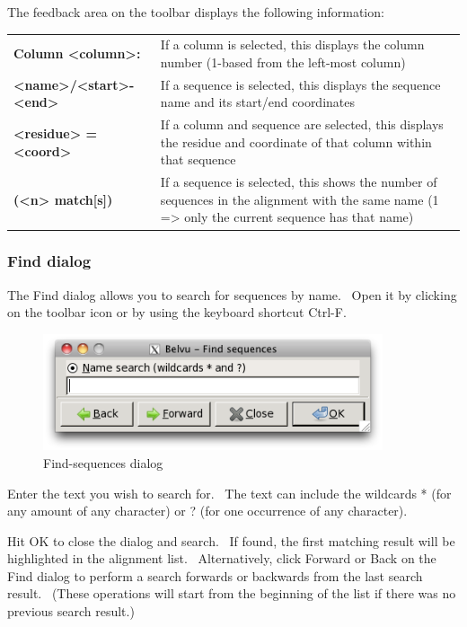 \documentclass[letterpaper]{article}
\begin{document}
\bigskip

The feedback area on the toolbar displays the following information:

\begin{supertabular}{>{\bfseries}p{0.4\textwidth} p{0.6\textwidth}}
Column {\textless}column{\textgreater}: &
If a column is selected, this displays the column number (1-based from the left-most column)\\
{\textless}name{\textgreater}/{\textless}start{\textgreater}-{\textless}end{\textgreater} &
If a sequence is selected, this displays the sequence name and its start/end coordinates\\
{\textless}residue{\textgreater} = {\textless}coord{\textgreater} &
If a column and sequence are selected, this displays the residue and coordinate of that column within that sequence\\
({\textless}n{\textgreater} match[s]) &
If a sequence is selected, this shows the number of sequences in the alignment with the same name (1 ={\textgreater} only the current sequence has that name)\\
\end{supertabular}


\subsubsection[Find dialog]{Find dialog}
The Find dialog allows you to search for sequences by name. \ Open it by clicking on the toolbar icon or by using the keyboard shortcut Ctrl-F.


\begin{figure}[htb]
\centering
\color{lightblue}
\includegraphics[width=10cm]{img_dialog_find_sequences.png}
\caption{Find-sequences dialog}
\label{fig:find_seqs}
\end{figure}

Enter the text you wish to search for. \ The text can include the wildcards {\textquotesingle}*{\textquotesingle} (for any amount of any character) or {\textquotesingle}?{\textquotesingle} (for one occurrence of any character).

Hit OK to close the dialog and search. \ If found, the first matching result will be highlighted in the alignment list. \ Alternatively, click Forward or Back on the Find dialog to perform a search forwards or backwards from the last search result. \ (These operations will start from the beginning of the list if there was no previous search result.)
\end{document}
